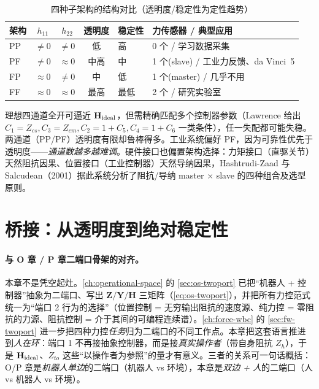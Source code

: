 \begin{table}[H]\centering\small
\caption{四种子架构的结构对比（透明度/稳定性为定性趋势）}
\label{tab:tt-arch}
\begin{tabular}{lcccll}
\toprule
架构 & $h_{11}$ & $h_{22}$ & 透明度 & 稳定性 & 力传感器 / 典型应用 \\
\midrule
PP & $\neq0$ & $\neq0$ & 低 & 高 & 0 个 / 学习数据采集 \\
PF & $\neq0$ & $\approx0$ & 中高 & 中 & 1 个(slave) / 工业力反馈、da Vinci~5 \\
FP & $\approx0$ & $\neq0$ & 中 & 低 & 1 个(master) / 几乎不用 \\
FF & $\approx0$ & $\approx0$ & 最高 & 最低 & 2 个 / 研究实验室 \\
\bottomrule
\end{tabular}
\end{table}

\begin{insight}[通道不是越多越好]\label{ins:tt-channels}
理想四通道全开可逼近 $\mathbf H_{\rm ideal}$，但需精确匹配多个控制器参数（Lawrence 给出 $C_1=Z_{cs},C_3=Z_{cm},C_2=1+C_5,C_4=1+C_6$ 一类条件\cite{lawrence1993stability}），任一失配都可能失稳。两通道（PP/PF）透明度有限却鲁棒得多。工业系统偏好 PF，因为可靠性优先于透明度——\emph{通道数越多越难调}。硬件接口也偏置架构选择：力矩接口（直驱关节）天然阻抗因果、位置接口（工业控制器）天然导纳因果，Hashtrudi-Zaad 与 Salcudean（2001）据此系统分析了阻抗/导纳 master $\times$ slave 的四种组合及选型原则\cite{hashtrudizaad2001analysis}。
\end{insight}

\section{桥接：从透明度到绝对稳定性}
\label{sec:tt-bridge}

\paragraph{与 O 章 / P 章二端口骨架的对齐。}
本章不是凭空起灶。\cref{ch:operational-space} 的 \cref{sec:os-twoport} 已把“机器人 + 控制器”抽象为二端口、写出 $\mathbf Z/\mathbf Y/\mathbf H$ 三矩阵（\cref{eq:os-twoport}），并把所有力控范式统一为“端口 2 行为的选择”（位置控制 = 无穷输出阻抗的速度源、纯力控 = 零阻抗的力源、阻抗控制 = 介于其间的可编程连续谱）。\cref{ch:force-wbc} 的 \cref{sec:fw-twoport} 进一步把四种力控\emph{任务}归为二端口的不同工作点。本章把这套语言推进到\emph{人在环}：端口 1 不再接抽象控制器，而是接\emph{真实操作者}（带自身阻抗 $Z_h$），于是 $\mathbf H_{\rm ideal}$、$Z_{to}$ 这些“以操作者为参照”的量才有意义。三者的关系可一句话概括：O/P 章是\emph{机器人单边}的二端口（机器人 vs 环境），本章是\emph{双边 + 人}的二端口（人 vs 机器人 vs 环境）。

